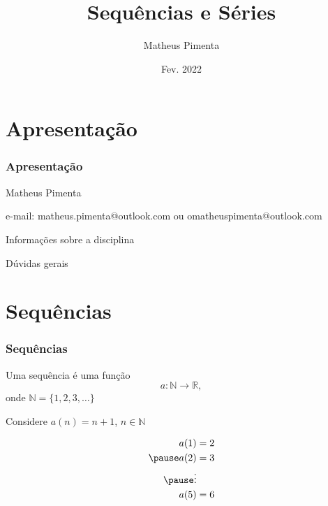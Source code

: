 \documentclass[hyperref={pdfpagelabels=false}]{beamer}
\title{Sequências e Séries}
\author[Matheus Pimenta]{Matheus Pimenta}
\institute[UEL]{\normalsize Universidade Estadual de Londrina \\
	Londrina
}
\date{Fev. 2022}
\begin{document}
	
\begin{frame}
\titlepage
\end{frame} 




\section{Apresentação} 


\begin{frame}
\frametitle{Apresentação} 

Matheus Pimenta \pause

e-mail: matheus.pimenta@outlook.com ou omatheuspimenta@outlook.com \pause

Informações sobre a disciplina \pause

Dúvidas gerais


\end{frame}

\section{Sequências}

\begin{frame}
\frametitle{Sequências}

\begin{definition}[Sequências]
    Uma sequência é uma função $$a: \mathbb{N} \rightarrow \mathbb{R},$$ onde $\mathbb{N} = \{1,2,3,\dots\}$
\end{definition} \pause

\begin{example}
 Considere $a(n) = n + 1$, $n \in \mathbb{N}$ \pause
 
 \begin{align*}
  a(1) &= 2 \\ \pause
  a(2) &= 3 \\ \pause
  \vdots \\ 
  a(5) &= 6
 \end{align*}

\end{example}


\end{frame}
\end{document}
